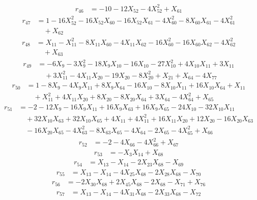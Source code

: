 \begin{align*}
r_{46}&=-10-12X_{52}-4X_{52}^{2}+X_{61}
\end{align*}
\begin{align*}
r_{47}&=1-16X_{52}^{2}-16X_{52}X_{60}-16X_{52}X_{61}-4X_{60}^{2}-8X_{60}X_{61}-4X_{61}^{2}\\
&\quad +X_{62}
\end{align*}
\begin{align*}
r_{48}&=X_{11}-X_{11}^{2}-8X_{11}X_{60}-4X_{11}X_{62}-16X_{60}^{2}-16X_{60}X_{62}-4X_{62}^{2}\\
&\quad +X_{63}
\end{align*}
\begin{align*}
r_{49}&=-6X_{9}-3X_{9}^{2}-18X_{9}X_{10}-16X_{10}-27X_{10}^{2}+4X_{10}X_{11}+3X_{11}\\
&\quad +3X_{11}^{2}-4X_{11}X_{20}-19X_{20}-8X_{20}^{2}+X_{21}+X_{64}-4X_{77}
\end{align*}
\begin{align*}
r_{50}&=1-8X_{9}-4X_{9}X_{11}+8X_{9}X_{64}-16X_{10}-8X_{10}X_{11}+16X_{10}X_{64}+X_{11}\\
&\quad +X_{11}^{2}+4X_{11}X_{20}+8X_{20}-8X_{20}X_{64}+3X_{64}-4X_{64}^{2}+X_{65}
\end{align*}
\begin{align*}
r_{51}&=-2-12X_{9}-16X_{9}X_{11}+16X_{9}X_{63}+16X_{9}X_{65}-24X_{10}-32X_{10}X_{11}\\
&\quad +32X_{10}X_{63}+32X_{10}X_{65}+4X_{11}+4X_{11}^{2}+16X_{11}X_{20}+12X_{20}-16X_{20}X_{63}\\
&\quad -16X_{20}X_{65}-4X_{63}^{2}-8X_{63}X_{65}-4X_{64}-2X_{65}-4X_{65}^{2}+X_{66}
\end{align*}
\begin{align*}
r_{52}&=-2-4X_{66}-4X_{66}^{2}+X_{67}
\end{align*}
\begin{align*}
r_{53}&=-X_{3}X_{14}+X_{68}
\end{align*}
\begin{align*}
r_{54}&=X_{13}-X_{14}-2X_{23}X_{68}-X_{69}
\end{align*}
\begin{align*}
r_{55}&=X_{13}-X_{14}-4X_{25}X_{68}-2X_{28}X_{68}-X_{70}
\end{align*}
\begin{align*}
r_{56}&=-2X_{30}X_{68}+2X_{45}X_{68}-2X_{68}-X_{71}+X_{76}
\end{align*}
\begin{align*}
r_{57}&=X_{13}-X_{14}-4X_{31}X_{68}-2X_{33}X_{68}-X_{72}
\end{align*}
